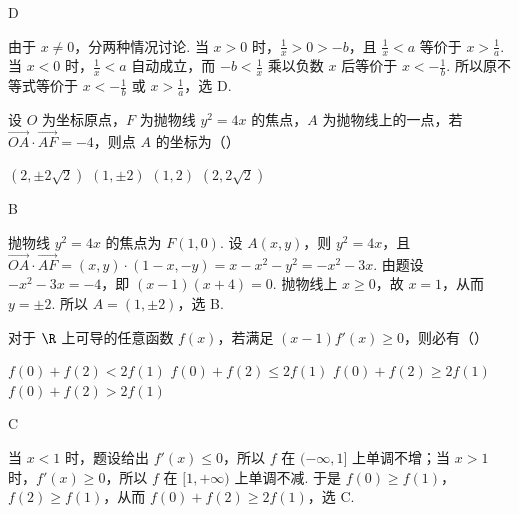 \begin{answer}
D
\end{answer}

\begin{solution}
由于 \(x\neq0\)，分两种情况讨论. 当 \(x>0\) 时，\(\frac{1}{x}>0>-b\)，且 \(\frac{1}{x}<a\) 等价于 \(x>\frac{1}{a}\). 当 \(x<0\) 时，\(\frac{1}{x}<a\) 自动成立，而 \(-b<\frac{1}{x}\) 乘以负数 \(x\) 后等价于 \(x<-\frac{1}{b}\). 所以原不等式等价于 \(x<-\frac{1}{b}\) 或 \(x>\frac{1}{a}\)，选 D.
\end{solution}

\begin{problem}
设 \(O\) 为坐标原点，\(F\) 为抛物线 \(y^{2} = 4x\) 的焦点，\(A\) 为抛物线上的一点，若 \( \overrightarrow{OA} \cdot \overrightarrow{AF} = -4 \)，则点 \(A\) 的坐标为（\quad）

\choices
    {\((2,\pm 2\sqrt{2})\)}
    {\((1,\pm 2)\)}
    {\((1,2)\)}
    {\((2,2\sqrt{2})\)}
\end{problem}

\begin{answer}
B
\end{answer}

\begin{solution}
抛物线 \(y^2=4x\) 的焦点为 \(F(1,0)\). 设 \(A(x,y)\)，则 \(y^2=4x\)，且
\(\overrightarrow{OA}\cdot\overrightarrow{AF}=(x,y)\cdot(1-x,-y)=x-x^2-y^2=-x^2-3x\).
由题设 \(-x^2-3x=-4\)，即 \((x-1)(x+4)=0\). 抛物线上 \(x\geqslant0\)，故 \(x=1\)，从而 \(y=\pm2\). 所以 \(A=(1,\pm2)\)，选 B.
\end{solution}

\begin{problem}
对于 \(\R\) 上可导的任意函数 \(f(x)\)，若满足 \((x - 1)f'(x) \geqslant 0\)，则必有（\quad）

\choices
    {\(f(0) + f(2) < 2f(1)\)}
    {\(f(0) + f(2)\leqslant 2f(1)\)}
    {\(f(0) + f(2)\geqslant 2f(1)\)}
    {\(f(0) + f(2) > 2f(1)\)}
\end{problem}

\begin{answer}
C
\end{answer}

\begin{solution}
当 \(x<1\) 时，题设给出 \(f'(x)\leqslant0\)，所以 \(f\) 在 \((-\infty,1]\) 上单调不增；当 \(x>1\) 时，\(f'(x)\geqslant0\)，所以 \(f\) 在 \([1,+\infty)\) 上单调不减. 于是 \(f(0)\geqslant f(1)\)，\(f(2)\geqslant f(1)\)，从而 \(f(0)+f(2)\geqslant2f(1)\)，选 C.
\end{solution}

